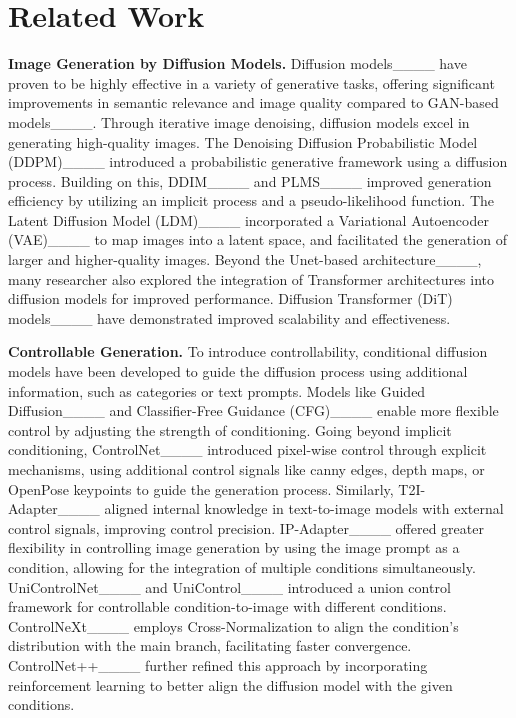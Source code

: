 \section{Related Work}
\noindent\textbf{Image Generation by Diffusion Models.}
Diffusion models____ have proven to be highly effective in a variety of generative tasks, offering significant improvements in semantic relevance and image quality compared to GAN-based models____. Through iterative image denoising, diffusion models excel in generating high-quality images.
The Denoising Diffusion Probabilistic Model (DDPM)____ introduced a probabilistic generative framework using a diffusion process. Building on this, DDIM____ and PLMS____ improved generation efficiency by utilizing an implicit process and a pseudo-likelihood function.
%
The Latent Diffusion Model (LDM)____ incorporated a Variational Autoencoder (VAE)____ to map images into a latent space, and facilitated the generation of larger and higher-quality images.
Beyond the Unet-based architecture____, many researcher also explored the integration of Transformer architectures into diffusion models for improved performance. Diffusion Transformer (DiT) models____ have demonstrated improved scalability and effectiveness.

\noindent\textbf{Controllable Generation.} 
To introduce controllability, conditional diffusion models have been developed to guide the diffusion process using additional information, such as categories or text prompts. Models like Guided Diffusion____ and Classifier-Free Guidance (CFG)____ enable more flexible control by adjusting the strength of conditioning.
Going beyond implicit conditioning, ControlNet____ introduced pixel-wise control through explicit mechanisms, using additional control signals like canny edges, depth maps, or OpenPose keypoints to guide the generation process. 
Similarly, T2I-Adapter____ aligned internal knowledge in text-to-image models with external control signals, improving control precision.
IP-Adapter____ offered greater flexibility in controlling image generation by using the image prompt as a condition, allowing for the integration of multiple conditions simultaneously.
UniControlNet____ and UniControl____ introduced a union control framework for controllable condition-to-image with different conditions.
ControlNeXt____ employs Cross-Normalization to align the condition’s distribution with the main branch, facilitating faster convergence. ControlNet++____ further refined this approach by incorporating reinforcement learning to better align the diffusion model with the given conditions.

